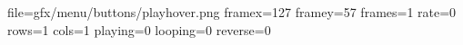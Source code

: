 file=gfx/menu/buttons/playhover.png
framex=127
framey=57
frames=1
rate=0
rows=1
cols=1
playing=0
looping=0
reverse=0